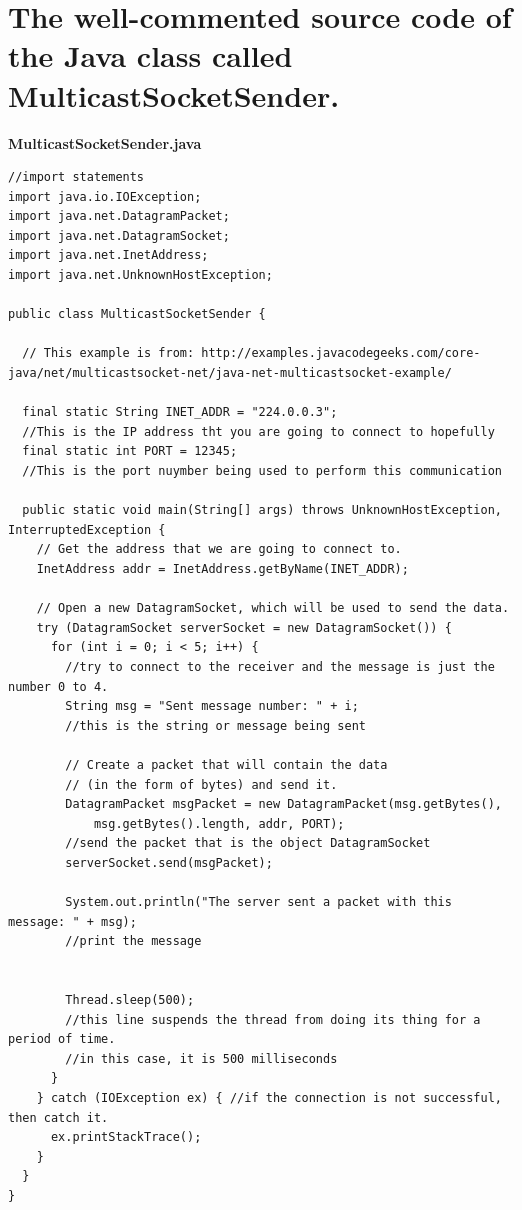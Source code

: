 \documentclass{article}
\begin{document}
\section{The well-commented source code of the Java class called MulticastSocketSender.}
\textbf{MulticastSocketSender.java}
\begin{lstlisting}
//import statements
import java.io.IOException;
import java.net.DatagramPacket;
import java.net.DatagramSocket;
import java.net.InetAddress;
import java.net.UnknownHostException;

public class MulticastSocketSender {

  // This example is from: http://examples.javacodegeeks.com/core-java/net/multicastsocket-net/java-net-multicastsocket-example/

  final static String INET_ADDR = "224.0.0.3";
  //This is the IP address tht you are going to connect to hopefully
  final static int PORT = 12345;
  //This is the port nuymber being used to perform this communication

  public static void main(String[] args) throws UnknownHostException, InterruptedException {
    // Get the address that we are going to connect to.
    InetAddress addr = InetAddress.getByName(INET_ADDR);

    // Open a new DatagramSocket, which will be used to send the data.
    try (DatagramSocket serverSocket = new DatagramSocket()) {
      for (int i = 0; i < 5; i++) {
        //try to connect to the receiver and the message is just the number 0 to 4.
        String msg = "Sent message number: " + i;
        //this is the string or message being sent

        // Create a packet that will contain the data
        // (in the form of bytes) and send it.
        DatagramPacket msgPacket = new DatagramPacket(msg.getBytes(),
            msg.getBytes().length, addr, PORT);
        //send the packet that is the object DatagramSocket 
        serverSocket.send(msgPacket);

        System.out.println("The server sent a packet with this message: " + msg);
        //print the message


        Thread.sleep(500);
        //this line suspends the thread from doing its thing for a period of time.
        //in this case, it is 500 milliseconds
      }
    } catch (IOException ex) { //if the connection is not successful, then catch it.
      ex.printStackTrace();
    }
  }
}

\end{lstlisting}
\end{document}
